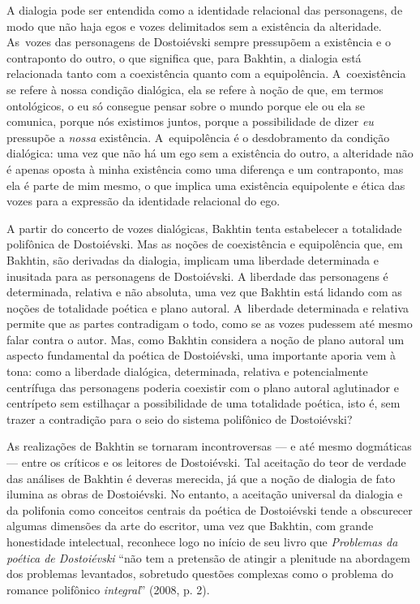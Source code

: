 A dialogia pode ser entendida como a identidade relacional das
personagens, de modo que não haja egos e vozes delimitados sem a
existência da alteridade. As~vozes das personagens de Dostoiévski sempre
pressupõem a existência e o contraponto do outro, o que significa que,
para Bakhtin, a dialogia está relacionada tanto com a coexistência
quanto com a equipolência. A~coexistência se refere à nossa condição
dialógica, ela se refere à noção de que, em termos ontológicos, o eu só
consegue pensar sobre o mundo porque ele ou ela se comunica, porque nós
existimos juntos, porque a possibilidade de dizer \emph{eu} pressupõe a
\emph{nossa} existência. A~equipolência é o desdobramento da condição
dialógica: uma vez que não há um ego sem a existência do outro, a
alteridade não é apenas oposta à minha existência como uma diferença e
um contraponto, mas ela é parte de mim mesmo, o que implica uma
existência equipolente e ética das vozes para a expressão da identidade
relacional do ego.

A partir do concerto de vozes dialógicas, Bakhtin tenta estabelecer a
totalidade polifônica de Dostoiévski. Mas as noções de coexistência e
equipolência que, em Bakhtin, são derivadas da dialogia, implicam uma
liberdade determinada e inusitada para as personagens de Dostoiévski. A
liberdade das personagens é determinada, relativa e não absoluta, uma
vez que Bakhtin está lidando com as noções de totalidade poética e plano
autoral. A~liberdade determinada e relativa permite que as partes
contradigam o todo, como se as vozes pudessem até mesmo falar contra o
autor. Mas, como Bakhtin considera a noção de plano autoral um aspecto
fundamental da poética de Dostoiévski, uma importante aporia vem à tona:
como a liberdade dialógica, determinada, relativa e potencialmente
centrífuga das personagens poderia coexistir com o plano autoral
aglutinador e centrípeto sem estilhaçar a possibilidade de uma
totalidade poética, isto é, sem trazer a contradição para o seio do
sistema polifônico de Dostoiévski?

As realizações de Bakhtin se tornaram incontroversas --- e até mesmo
dogmáticas --- entre os críticos e os leitores de Dostoiévski. Tal
aceitação do teor de verdade das análises de Bakhtin é deveras merecida,
já que a noção de dialogia de fato ilumina as obras de Dostoiévski. No
entanto, a aceitação universal da dialogia e da polifonia como conceitos
centrais da poética de Dostoiévski tende a obscurecer algumas dimensões
da arte do escritor, uma vez que Bakhtin, com grande honestidade
intelectual, reconhece logo no início de seu livro que \emph{Problemas
da poética de Dostoiévski} ``não tem a pretensão de atingir a plenitude
na abordagem dos problemas levantados, sobretudo questões complexas como
o problema do romance polifônico \emph{integral}'' (2008, p. 2).

